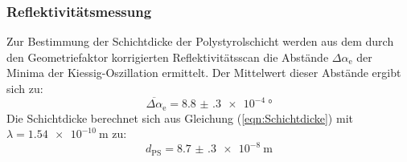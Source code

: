 \subsubsection{Reflektivitätsmessung}
Zur Bestimmung der Schichtdicke der Polystyrolschicht werden aus dem durch den Geometriefaktor korrigierten Reflektivitätsscan die Abstände $\Delta\alpha_\mathrm{e}$ der Minima der Kiessig-Oszillation
ermittelt. Der Mittelwert dieser Abstände ergibt sich zu:
\begin{equation}
  \overline{\Delta\alpha}_\mathrm{e} = \SI{8.8(3) e-4}{\degree}
\end{equation}
Die Schichtdicke berechnet sich aus Gleichung (\ref{eqn:Schichtdicke}) mit $\lambda=\SI{1.54 e-10}{\meter}$ zu:
\begin{equation*}
  d_\mathrm{PS}=\SI{8.7(3) e-8}{\meter}
\end{equation*}

